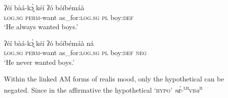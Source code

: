 \documentclass[output=paper,colorlinks=true, citecolor=brown]{langscibook}
\begin{document}

\ea\label{ex:gba:6}
    \gll ʔéí bàá-kɔ̰̀ kéí ʔó bóíbémáà \\ 
         \textsc{log.sg} \textsc{perm}-want as\_for:\textsc{log.sg} \textsc{pl} boy:\textsc{def} \\
    \glt ‘He always wanted boys.’
\z 

\ea\label{ex:gba:7}
    \gll ʔéí bàá-kɔ̰̀ kéí ʔó bóíbémáà ná \\ 
         \textsc{log.sg} \textsc{perm}-want as\_for:\textsc{log.sg} \textsc{pl} boy:\textsc{def} \textsc{neg} \\
    \glt ‘He never wanted boys.’
\z 


Within the linked AM forms of realis mood, only the hypothetical can be negated. Since in the affirmative the hypothetical ‘\textsc{hypo}’ {\textit{nɛ́}-\textsuperscript{\textsc{lh}}\textsc{vb}\textit{a}\textsuperscript{\textsc{h}}}
\end{document}
